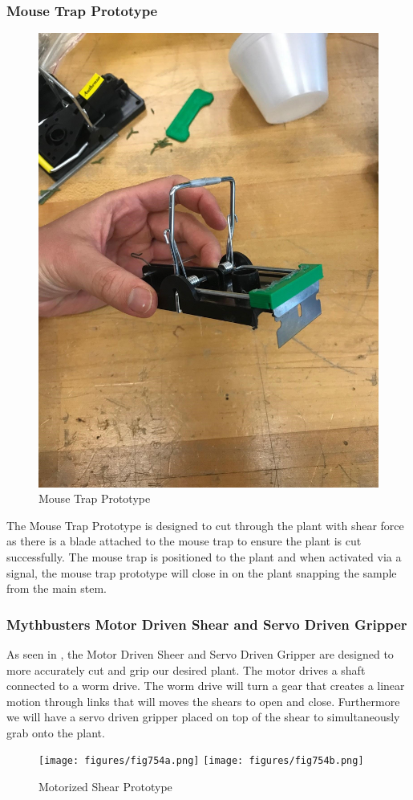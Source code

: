 \documentclass{wrcecapstone}
\begin{document}
\subsubsection{Mouse Trap Prototype}
\begin{figure}
\begin{center}
\includegraphics[width=0.5\columnwidth]{figures/fig753.jpg}
\end{center}
\caption{Mouse Trap Prototype}
\label{fig:7.5.3}
\end{figure}
The Mouse Trap Prototype is designed to cut through the plant with shear force as there is a blade attached to the mouse trap to ensure the plant is cut successfully. The mouse trap is positioned to the plant and when activated via a signal, the mouse trap prototype will close in on the plant snapping the sample from the main stem. 

\subsubsection{Mythbusters Motor Driven Shear and Servo Driven Gripper}
As seen in , %
the Motor Driven Sheer and Servo Driven Gripper are designed to more accurately cut and grip our desired plant. The motor drives a shaft connected to a worm drive. The worm drive will turn a gear that creates a linear motion through links that will moves the shears to open and close. Furthermore we will have a servo driven gripper placed on top of the shear to simultaneously grab onto the plant.
\begin{figure}
\begin{center}
\texttt{[image: figures/fig754a.png]}
\texttt{[image: figures/fig754b.png]}
\end{center}
\caption{Motorized Shear Prototype}
\label{fig:7.5.4}
\end{figure}
\end{document}
